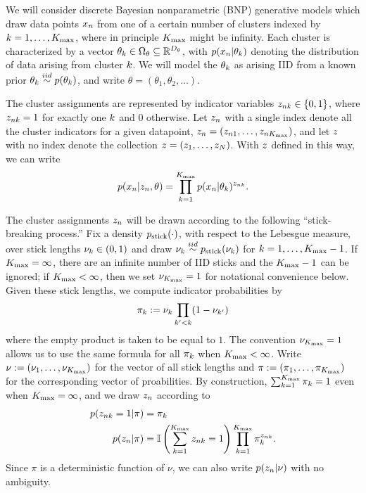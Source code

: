 We will consider discrete Bayesian nonparametric (BNP) generative models which
draw data points $x_n$ from one of a certain number of clusters indexed by $k =
1, \ldots, {K_{\mathrm{max}}}$, where in principle ${K_{\mathrm{max}}}$ might be infinity.  Each cluster
is characterized by a vector $\theta_k \in \Omega_{\theta} \subseteq
\mathbb{R}^{{D_{\theta}}}$, with $p(x_n \vert \theta_k)$ denoting the
distribution of data arising from  cluster $k$. We will model the $\theta_k$
as arising IID from a known prior $\theta_k \overset{iid}{\sim} p(\theta_k)$, and write
$\theta = (\theta_1, \theta_2, \ldots)$.

The cluster assignments are represented by indicator variables $z_{nk} \in
\{0, 1\}$, where $z_{nk} = 1$ for exactly one $k$ and $0$ otherwise.  Let
$z_n$ with a single index denote all the cluster indicators for a given
datapoint, $z_n = (z_{n1}, \ldots, z_{n{K_{\mathrm{max}}}})$, and let $z$ with no
index denote the collection $z = (z_1, \ldots, z_N)$.  With $z$ defined in
this way, we can write
%
\begin{align*}
%
p(\x_n \vert \z_\n, \theta) =
    \prod_{k=1}^\kmax p(\x_n \vert \theta_\k)^{\z_{\n\k}}.
%
\end{align*}


The cluster assignments $z_{n}$ will be drawn according to the following
``stick-breaking process.''  Fix a density $p_{\mathrm{stick}}(\cdot)$, with respect to the
Lebesgue measure, over stick lengths $\nu_{k} \in (0, 1)$ and draw $\nu_{k} \overset{iid}{\sim}
p_{\mathrm{stick}}(\nu_{k})$ for $k=1,\ldots,{K_{\mathrm{max}}} - 1$.  If ${K_{\mathrm{max}}} = \infty$, there are an
infinite number of IID sticks and the ${K_{\mathrm{max}}} - 1$ can be ignored; if ${K_{\mathrm{max}}} <
\infty$, then we set $\nu_{{K_{\mathrm{max}}}} = 1$ for notational convenience below.  Given
these stick lengths, we compute indicator probabilities by
%
\begin{align*}
%
\pi_\k := \nuk \prod_{\k' < \k} (1 - \nu_{\k'})
%
\end{align*}
%
where the empty product is taken to be equal to $1$. The convention $\nu_{{K_{\mathrm{max}}}} =
1$ allows us to use the same formula for all $\pi_k$ when ${K_{\mathrm{max}}} < \infty$.
Write $\nu := (\nu_1, \ldots, \nu_{{K_{\mathrm{max}}}})$ for the vector of all stick lengths
and $\pi := (\pi_1, \ldots, \pi_{K_{\mathrm{max}}})$ for the corresponding vector of
proabilities. By construction, $\sum_{k=1}^{{K_{\mathrm{max}}}} \pi_k = 1$ even when ${K_{\mathrm{max}}} =
\infty$, and we draw $z_n$ according to
%
\begin{align*}
%
p(\z_{\n\k} = 1 \vert \pi) ={}& \pi_\k \\
p(\z_\n \vert \pi) ={}&
    \ind{\sum_{\k=1}^{\kmax} \z_{\n\k} = 1}
    \prod_{k=1}^{\kmax} \pi_\k^{\z_{\n\k}}.
%
\end{align*}
%
Since $\pi$ is a deterministic function of $\nu$, we can also write
$p(z_n \vert \nu)$ with no ambiguity.

